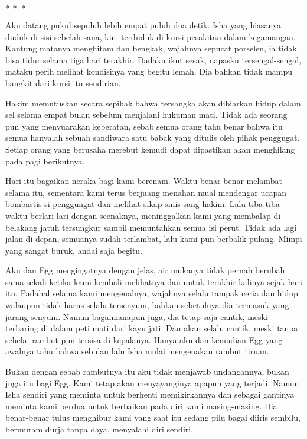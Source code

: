 \documentclass[smalldemyvopaper,11pt,twoside,onecolumn,openright,extrafontsizes]{memoir}
\newcommand\separator{
  \begin{center}
    \(\ast~\ast~\ast\)
  \end{center}
}
\begin{document}
\separator{}


Aku datang pukul sepuluh lebih empat puluh dua detik. Isha yang biasanya duduk di sisi sebelah sana, kini terduduk di kursi pesakitan dalam kegamangan. Kantung matanya menghitam dan bengkak, wajahnya sepucat porselen, ia tidak bisa tidur selama tiga hari terakhir. Dadaku ikut sesak, napasku tersengal-sengal, mataku perih melihat kondisinya yang begitu lemah. Dia bahkan tidak mampu bangkit dari kursi itu sendirian.

Hakim memutuskan secara sepihak bahwa tersangka akan dibiarkan hidup dalam sel selama empat bulan sebelum menjalani hukuman mati. Tidak ada seorang pun yang menyuarakan keberatan, sebab semua orang tahu benar bahwa itu semua hanyalah sebuah sandiwara satu babak yang ditulis oleh pihak penggugat. Setiap orang yang berusaha merebut kemudi dapat dipastikan akan menghilang pada pagi berikutnya.

Hari itu bagaikan neraka bagi kami berenam. Waktu benar-benar melambat selama itu, sementara kami terus berjuang menahan mual mendengar ucapan bombastis si penggungat dan melihat sikap sinis sang hakim. Lalu tiba-tiba waktu berlari-lari dengan seenaknya, meninggalkan kami yang membalap di belakang jatuh tersungkur sambil memuntahkan semua isi perut. Tidak ada lagi jalan di depan, semuanya sudah terlambat, lalu kami pun berbalik pulang. Mimpi yang sangat buruk, andai saja begitu.

Aku dan Egg mengingatnya dengan jelas, air mukanya tidak pernah berubah sama sekali ketika kami kembali melihatnya dan untuk terakhir kalinya sejak hari itu. Padahal selama kami mengenalnya, wajahnya selalu tampak ceria dan hidup walaupun tidak harus selalu tersenyum, bahkan sebetulnya dia termasuk yang jarang senyum. Namun bagaimanapun juga, dia tetap saja cantik, meski terbaring di dalam peti mati dari kayu jati. Dan akan selalu cantik, meski tanpa sehelai rambut pun tersisa di kepalanya. Hanya aku dan kemudian Egg yang awalnya tahu bahwa sebulan lalu Isha mulai mengenakan rambut tiruan.


Bukan dengan sebab rambutnya itu aku tidak menjawab undangannya, bukan juga itu bagi Egg. Kami tetap akan menyayanginya apapun yang terjadi. Namun Isha sendiri yang meminta untuk berhenti memikirkannya dan sebagai gantinya meminta kami berdua untuk berbaikan pada diri kami masing-masing. Dia benar-benar tulus menghibur kami yang saat itu sedang pilu bagai diiris sembilu, bermuram durja tanpa daya, menyalahi diri sendiri.
\end{document}
